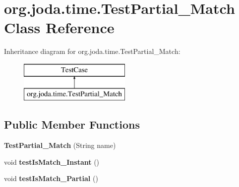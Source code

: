 \hypertarget{classorg_1_1joda_1_1time_1_1_test_partial___match}{\section{org.\-joda.\-time.\-Test\-Partial\-\_\-\-Match Class Reference}
\label{classorg_1_1joda_1_1time_1_1_test_partial___match}
}
Inheritance diagram for org.\-joda.\-time.\-Test\-Partial\-\_\-\-Match\-:\begin{figure}[H]
\begin{center}
\leavevmode
\includegraphics[height=2.000000cm]{classorg_1_1joda_1_1time_1_1_test_partial___match}
\end{center}
\end{figure}
\subsection*{Public Member Functions}
\begin{DoxyCompactItemize}
\item 
\hypertarget{classorg_1_1joda_1_1time_1_1_test_partial___match_a14ad3205178508d8c7b0c2d274e4316b}{{\bfseries Test\-Partial\-\_\-\-Match} (String name)}\label{classorg_1_1joda_1_1time_1_1_test_partial___match_a14ad3205178508d8c7b0c2d274e4316b}

\item 
\hypertarget{classorg_1_1joda_1_1time_1_1_test_partial___match_adc746e7c10505797d76e1a87cae5ebea}{void {\bfseries test\-Is\-Match\-\_\-\-Instant} ()}\label{classorg_1_1joda_1_1time_1_1_test_partial___match_adc746e7c10505797d76e1a87cae5ebea}

\item 
\hypertarget{classorg_1_1joda_1_1time_1_1_test_partial___match_a013a8f66bc240bbfd9a7879b10a11143}{void {\bfseries test\-Is\-Match\-\_\-\-Partial} ()}\label{classorg_1_1joda_1_1time_1_1_test_partial___match_a013a8f66bc240bbfd9a7879b10a11143}

\end{DoxyCompactItemize}
